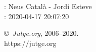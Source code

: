 \documentclass[11pt]{article}
\begin{document}
    \newcommand{\SampleTwoCol}{\SampleTwoColInputOutput{sample1}{1}\SampleTwoColInputOutput{sample2}{2}}
    \newcommand{\SampleOneCol}{\SampleOneColInputOutput{sample1}{1}\SampleOneColInputOutput{sample2}{2}}

    \ProblemInformation
    \Author: Neus Català - Jordi Esteve\\    
    \Generation: 2020-04-17 20:07:20

    \bigskip

    \copyright\ \emph{Jutge.org}, 2006--2020. \\
    https:$/\!\!/$jutge.org
\end{document}
